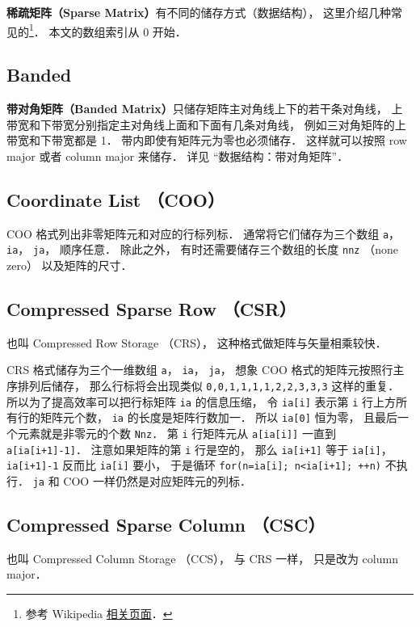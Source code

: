 
\textbf{稀疏矩阵（Sparse Matrix）}有不同的储存方式（数据结构）， 这里介绍几种常见的\footnote{参考 Wikipedia \href{https://en.wikipedia.org/wiki/Sparse_matrix}{相关页面}．}． 本文的数组索引从 0 开始．

\subsection{Banded}
\textbf{带对角矩阵（Banded Matrix）}只储存矩阵主对角线上下的若干条对角线， 上带宽和下带宽分别指定主对角线上面和下面有几条对角线， 例如三对角矩阵的上带宽和下带宽都是 1． 带内即使有矩阵元为零也必须储存． 这样就可以按照 row major 或者 column major 来储存． 详见 “数据结构：带对角矩阵”．

\subsection{Coordinate List （COO）}
COO 格式列出非零矩阵元和对应的行标列标． 通常将它们储存为三个数组 \verb|a|， \verb|ia|， \verb|ja|， 顺序任意． 除此之外， 有时还需要储存三个数组的长度 \verb|nnz| （none zero） 以及矩阵的尺寸．

\subsection{Compressed Sparse Row （CSR）}
也叫 Compressed Row Storage （CRS）， 这种格式做矩阵与矢量相乘较快．

CRS 格式储存为三个一维数组 \verb|a|， \verb|ia|， \verb|ja|， 想象 COO 格式的矩阵元按照行主序排列后储存， 那么行标将会出现类似 \verb|0,0,1,1,1,1,2,2,3,3,3| 这样的重复． 所以为了提高效率可以把行标矩阵 \verb|ia| 的信息压缩， 令 \verb|ia[i]| 表示第 \verb|i| 行上方所有行的矩阵元个数， \verb|ia| 的长度是矩阵行数加一． 所以 \verb|ia[0]| 恒为零， 且最后一个元素就是非零元的个数 \verb|Nnz|． 第 \verb|i| 行矩阵元从 \verb|a[ia[i]]| 一直到 \verb|a[ia[i+1]-1]|． 注意如果矩阵的第 \verb|i| 行是空的， 那么 \verb|ia[i+1]| 等于 \verb|ia[i]|， \verb|ia[i+1]-1| 反而比 \verb|ia[i]| 要小， 于是循环 \verb|for(n=ia[i]; n<ia[i+1]; ++n)| 不执行． \verb|ja| 和 COO 一样仍然是对应矩阵元的列标．

\subsection{Compressed Sparse Column （CSC）}
也叫 Compressed Column Storage （CCS）， 与 CRS 一样， 只是改为 column major．
